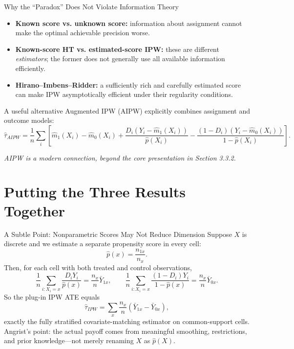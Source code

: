 \documentclass[aspectratio=169,11pt]{beamer}
\begin{document}
\begin{frame}{Why the ``Paradox'' Does Not Violate Information Theory}
\small
\begin{itemize}
\item \textbf{Known score vs. unknown score:} information about assignment cannot make the optimal achievable precision worse.
\item \textbf{Known-score HT vs. estimated-score IPW:} these are different \emph{estimators}; the former does not generally use all available information efficiently.
\item \textbf{Hirano--Imbens--Ridder:} a sufficiently rich and carefully estimated score can make IPW asymptotically efficient under their regularity conditions.
\end{itemize}
\medskip
\begin{block}{A useful alternative}
Augmented IPW (AIPW) explicitly combines assignment and outcome models:
\[
\hat\tau_{AIPW}=\frac1n\sum_i\left[\hat m_1(X_i)-\hat m_0(X_i)+\frac{D_i(Y_i-\hat m_1(X_i))}{\hat p(X_i)}-\frac{(1-D_i)(Y_i-\hat m_0(X_i))}{1-\hat p(X_i)}\right].
\]
\end{block}
\textit{AIPW is a modern connection, beyond the core presentation in Section 3.3.2.}
\end{frame}

\section{Putting the Three Results Together}
\begin{frame}{A Subtle Point: Nonparametric Scores May Not Reduce Dimension}
\small
Suppose \(X\) is discrete and we estimate a separate propensity score in every cell:
\[
\hat p(x)=\frac{n_{1x}}{n_x}.
\]
Then, for each cell with both treated and control observations,
\[
\frac{1}{n}\sum_{i:X_i=x}\frac{D_iY_i}{\hat p(x)}
=\frac{n_x}{n}\bar Y_{1x},\qquad
\frac{1}{n}\sum_{i:X_i=x}\frac{(1-D_i)Y_i}{1-\hat p(x)}
=\frac{n_x}{n}\bar Y_{0x}.
\]
So the plug-in IPW ATE equals
\[
\boxed{\hat\tau_{IPW}=\sum_x\frac{n_x}{n}(\bar Y_{1x}-\bar Y_{0x}),}
\]
exactly the fully stratified covariate-matching estimator on common-support cells.
\medskip
\alert{Angrist's point:} the actual payoff comes from meaningful smoothing, restrictions, and prior knowledge---not merely renaming \(X\) as \(\hat p(X)\).
\end{frame}
\end{document}
